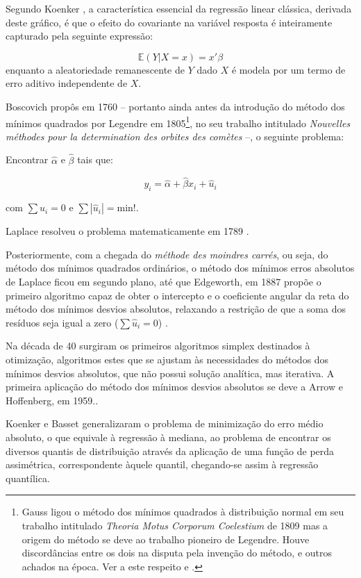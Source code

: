 \documentclass[a4paper, 12pt]{article}
\let\rmarkdownfootnote\footnote%
\def\footnote{\protect\rmarkdownfootnote}
\begin{document}
Segundo Koenker \autocite*{koenker2000}, a característica essencial da
regressão linear clássica, derivada deste gráfico, é que o efeito do
covariante na variável resposta é inteiramente capturado pela seguinte
expressão:

\[\mathbb{E}(Y|X = x) = x'\beta\] enquanto a aleatoriedade remanescente
de \(Y\) dado \(X\) é modela por um termo de erro aditivo independente
de \(X\).

Boscovich propôs em 1760 \autocite[281]{tortoise} -- portanto ainda
antes da introdução do método dos mínimos quadrados por Legendre em
1805\footnote{Gauss ligou o método dos mínimos quadrados à distribuição
  normal em seu trabalho intitulado \emph{Theoria Motus Corporum
  Coelestium} de 1809 mas a origem do método se deve ao trabalho
  pioneiro de Legendre. Houve discordâncias entre os dois na disputa
  pela invenção do método, e outros achados na época. Ver a este
  respeito \textcite{STIGLER197731} e \textcite{stigler1981}.}, no seu
trabalho intitulado \emph{Nouvelles méthodes pour la determination des
orbites des comètes} --, o seguinte problema:

Encontrar \(\hat \alpha\) e \(\hat \beta\) tais que:

\[y_i = \hat \alpha + \hat \beta x_i + \hat u_i\]

com \(\sum \hat u_i = 0\) e \(\sum |\hat u_i| = \text{min!}\).

Laplace resolveu o problema matematicamente em 1789
\autocite[281]{tortoise}.

Posteriormente, com a chegada do \emph{méthode des moindres carrés}, ou
seja, do método dos mínimos quadrados ordinários, o método dos mínimos
erros absolutos de Laplace ficou em segundo plano, até que Edgeworth, em
1887 propõe o primeiro algoritmo capaz de obter o intercepto e o
coeficiente angular da reta do método dos mínimos desvios absolutos,
relaxando a restrição de que a soma dos resíduos seja igual a zero
(\(\sum \hat u_i = 0\)) \autocite[281]{tortoise}.

Na década de 40 surgiram os primeiros algoritmos simplex destinados à
otimização, algoritmos estes que se ajustam às necessidades do métodos
dos mínimos desvios absolutos, que não possui solução analítica, mas
iterativa. A primeira aplicação do método dos mínimos desvios absolutos
se deve a Arrow e Hoffenberg, em 1959.\autocite[281]{tortoise}.

Koenker e Basset \autocite*{koenker1978} generalizaram o problema de
minimização do erro médio absoluto, o que equivale à regressão à
mediana, ao problema de encontrar os diversos quantis de distribuição
através da aplicação de uma função de perda assimétrica, correspondente
àquele quantil, chegando-se assim à regressão quantílica.
\end{document}
